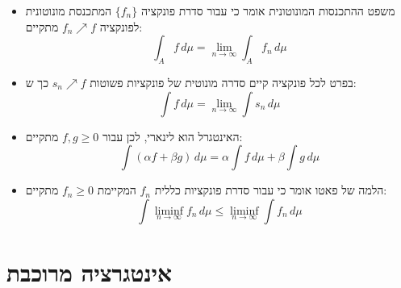 \documentclass{tstextbook}
\begin{document}
\begin{summary}
  \begin{itemize}
    \item משפט ההתכנסות המונוטונית אומר כי עבור סדרת פונקציה \(\{ f_{n} \}\) המתכנסת מונוטונית לפונקציה \(f_n \nearrow f\) מתקיים:
$$\int_A f \, d\mu = \lim_{n \to \infty} \int_A f_n \, d\mu$$
    \item בפרט לכל פונקציה קיים סדרה מונוטית של פונקציות פשוטות \(s_n \nearrow f\) כך ש:
$$\int f \, d\mu = \lim_{n \to \infty} \int s_n \, d\mu$$
    \item האינטגרל הוא לינארי, לכן עבור \(f,g \geq 0\) מתקיים:
$$\int \left( \alpha f+\beta g \right) \, d\mu = \alpha\int f \, d\mu + \beta\int g \, d\mu$$
    \item הלמה של פאטו אומר כי עבור סדרת פונקציות כללית \(f_{n}\) המקיימת \(f_n \geq 0\) מתקיים:
$$\int \liminf_{n \to \infty} f_n \, d\mu \leq \liminf_{n \to \infty} \int f_n \, d\mu$$
  \end{itemize}
\end{summary}
\section{אינטגרציה מרוכבת}
\end{document}
